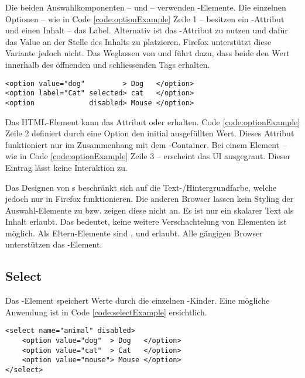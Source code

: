 Die beiden Auswahlkomponenten –  und  – verwenden -Elemente. 
Die einzelnen Optionen – wie in Code \ref{code:optionExample} Zeile 1 – besitzen ein -Attribut und einen Inhalt – das Label. 
Alternativ ist das -Attribut zu nutzen und dafür das Value an der Stelle des Inhalts zu platzieren. 
Firefox unterstützt diese Variante jedoch nicht. 
Das Weglassen von  und  führt dazu, dass beide den Wert innerhalb des öffnenden und schliessenden Tags erhalten. 

\begin{lstlisting}[style = htmlcssjs, caption = Option Beispiel, label = code:optionExample]
<option value="dog"         > Dog   </option>
<option label="Cat" selected> cat   </option>
<option             disabled> Mouse </option>
\end{lstlisting} 

Das HTML-Element kann das Attribut  oder  erhalten. 
Code \ref{code:optionExample} Zeile 2 definiert durch eine  Option den initial ausgefüllten Wert. 
Dieses Attribut funktioniert nur im Zusammenhang mit dem -Container.
Bei einem  Element – wie in Code \ref{code:optionExample} Zeile 3 – erscheint das UI ausgegraut. 
Dieser Eintrag lässt keine Interaktion zu. 

Das Designen von s beschränkt sich auf die Text-/Hintergrundfarbe, welche jedoch nur in Firefox funktionieren. 
Die anderen Browser lassen kein Styling der Auswahl-Elemente zu bzw. zeigen diese nicht an. 
Es ist nur ein skalarer Text als Inhalt erlaubt. 
Das bedeutet, keine weitere Verschachtelung von Elementen ist möglich. 
Als Eltern-Elemente sind ,  und  erlaubt. 
Alle gängigen Browser unterstützen das -Element. 


\subsection{Select}
\label{sec:select}

Das -Element speichert Werte durch die einzelnen -Kinder. 
Eine mögliche Anwendung ist in Code \ref{code:selectExample} ersichtlich. 

\begin{lstlisting}[style = htmlcssjs, caption = Disabled Select Beispiel, label = code:selectExample]
<select name="animal" disabled>
    <option value="dog"  > Dog   </option>
    <option value="cat"  > Cat   </option>
    <option value="mouse"> Mouse </option>
</select>
\end{lstlisting}

